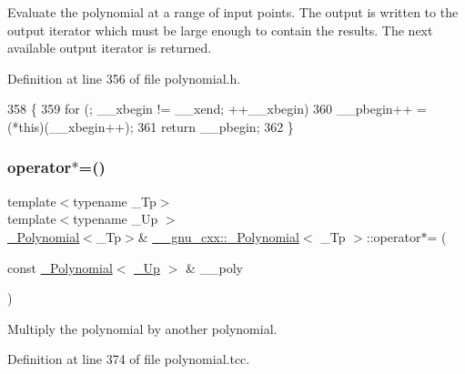 Evaluate the polynomial at a range of input points. The output is written to the output iterator which must be large enough to contain the results. The next available output iterator is returned. 

Definition at line 356 of file polynomial.\+h.


\begin{DoxyCode}
358         \{
359           \textcolor{keywordflow}{for} (; \_\_xbegin != \_\_xend; ++\_\_xbegin)
360             \_\_pbegin++ = (*\textcolor{keyword}{this})(\_\_xbegin++);
361           \textcolor{keywordflow}{return} \_\_pbegin;
362         \}
\end{DoxyCode}
\mbox{\label{class____gnu__cxx_1_1__Polynomial_a5e5dae4944bc0352b6b360f8decd2d07}} 
\subsubsection{\texorpdfstring{operator$\ast$=()}{operator*=()}\hspace{0.1cm}{\footnotesize\ttfamily [1/3]}}
{\footnotesize\ttfamily template$<$typename \+\_\+\+Tp$>$ \\
template$<$typename \+\_\+\+Up $>$ \\
\hyperlink{class____gnu__cxx_1_1__Polynomial}{\+\_\+\+Polynomial}$<$\+\_\+\+Tp$>$\& \hyperlink{class____gnu__cxx_1_1__Polynomial}{\+\_\+\+\_\+gnu\+\_\+cxx\+::\+\_\+\+Polynomial}$<$ \+\_\+\+Tp $>$\+::operator$\ast$= (\begin{DoxyParamCaption}\item[{const \hyperlink{class____gnu__cxx_1_1__Polynomial}{\+\_\+\+Polynomial}$<$ \hyperlink{class____gnu__cxx_1_1__Polynomial_a242114d4b86648a5dff67a8221f80d40}{\+\_\+\+Up} $>$ \&}]{\+\_\+\+\_\+poly }\end{DoxyParamCaption})}

Multiply the polynomial by another polynomial. 

Definition at line 374 of file polynomial.\+tcc.


